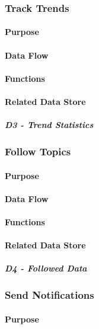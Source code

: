 \subsubsection*{Track Trends}
\paragraph{Purpose}

\paragraph{Data Flow}

\paragraph{Functions}

\paragraph{Related Data Store}
\subparagraph{D3 - Trend Statistics}

\subsubsection*{Follow Topics}
\paragraph{Purpose}

\paragraph{Data Flow}

\paragraph{Functions}

\paragraph{Related Data Store}
\subparagraph{D4 - Followed Data}

\subsubsection*{Send Notifications}
\paragraph{Purpose}

